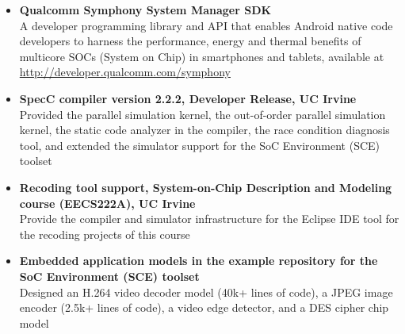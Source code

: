 

%
%

\begin{itemize}
\item \textbf{Qualcomm Symphony System Manager SDK}\\
A developer programming library and API that enables Android native code developers to harness the performance, energy and thermal benefits of multicore SOCs (System on Chip) in smartphones and tablets, 
available at \href{http://developer.qualcomm.com/symphony}{http://developer.qualcomm.com/symphony}

\item \textbf{SpecC compiler version 2.2.2, Developer Release, UC Irvine}\\
Provided the parallel simulation kernel, the out-of-order parallel simulation kernel, the static code analyzer in the compiler, the race condition diagnosis tool, and 
extended the simulator support for the SoC Environment (SCE) toolset

\item \textbf{Recoding tool support, System-on-Chip Description and Modeling course (EECS222A), UC Irvine} \\
Provide the compiler and simulator infrastructure for the Eclipse IDE tool for the recoding projects of this course

\item \textbf{Embedded application models in the example repository for the SoC Environment (SCE) toolset}\\
Designed an H.264 video decoder model (40k+ lines of code), 
a JPEG image encoder (2.5k+ lines of code), 
a video edge detector, and a DES cipher chip model
\end{itemize}

